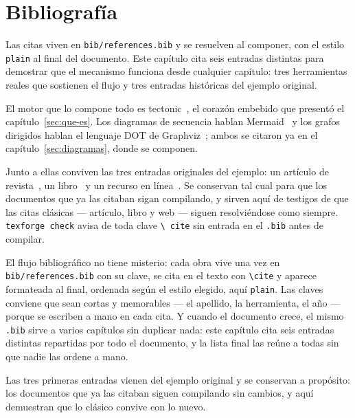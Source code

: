 \section{Bibliografía}\label{sec:bib}

Las citas viven en \texttt{bib/references.bib} y se resuelven al componer,
con el estilo \texttt{plain} al final del documento. Este capítulo cita
seis entradas distintas para demostrar que el mecanismo funciona desde
cualquier capítulo: tres herramientas reales que sostienen el flujo y tres
entradas históricas del ejemplo original.

El motor que lo compone todo es tectonic~\cite{tectonic}, el corazón
embebido que presentó el capítulo~\ref{sec:que-es}. Los diagramas de
secuencia hablan Mermaid~\cite{mermaid} y los grafos dirigidos hablan el
lenguaje DOT de Graphviz~\cite{graphviz}; ambos se citaron ya en el
capítulo~\ref{sec:diagramas}, donde se componen.

Junto a ellas conviven las tres entradas originales del ejemplo: un
artículo de revista~\cite{example}, un libro~\cite{example2} y un recurso
en línea~\cite{example3}. Se conservan tal cual para que los documentos
que ya las citaban sigan compilando, y sirven aquí de testigos de que las
citas clásicas --- artículo, libro y web --- siguen resolviéndose como
siempre. \texttt{texforge check} avisa de toda clave \texttt{\textbackslash
  cite} sin entrada en el \texttt{.bib} antes de compilar.

El flujo bibliográfico no tiene misterio: cada obra vive una vez en
\texttt{bib/references.bib} con su clave, se cita en el texto con
\texttt{\textbackslash cite} y aparece formateada al final, ordenada según
el estilo elegido, aquí \texttt{plain}. Las claves conviene que sean
cortas y memorables --- el apellido, la herramienta, el año --- porque se
escriben a mano en cada cita. Y cuando el documento crece, el mismo
\texttt{.bib} sirve a varios capítulos sin duplicar nada: este capítulo
cita seis entradas distintas repartidas por todo el documento, y la lista
final las reúne a todas sin que nadie las ordene a mano.

\begin{notebox}
  Las tres primeras entradas vienen del ejemplo original y se conservan a
  propósito: los documentos que ya las citaban siguen compilando sin
  cambios, y aquí demuestran que lo clásico convive con lo nuevo.
\end{notebox}
